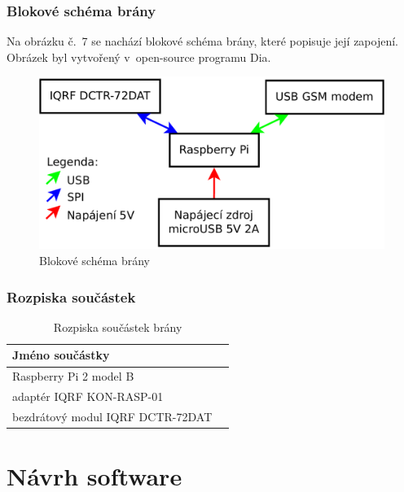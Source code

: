\documentclass[12pt,a4paper,oneside]{article}
\begin{document}
\newpage

\subsubsection{Blokové schéma brány}

Na obrázku č.~7 se nachází blokové schéma brány, které popisuje její zapojení. Obrázek byl vytvořený v~open-source programu Dia\cite{sw/dia}.

\begin{figure}[H]
\centering
\label{fig:blokove-schema-zasuvky}
\includegraphics[width = 128mm]{img/blokove-schema/brana.pdf}
\caption{Blokové schéma brány}
\end{figure}

\subsubsection{Rozpiska součástek}

\begin{table}[H]
	\centering
	\begin{tabular}{|l|l|}
		\hline
    \textbf{Jméno součástky} \\
		\hline
		\hline
    Raspberry Pi 2 model B \\
		\hline
    adaptér IQRF KON-RASP-01 \\
		\hline
    bezdrátový modul IQRF DCTR-72DAT \\
		\hline
	\end{tabular}
	\caption{Rozpiska součástek brány}\label{table:rozpiska-soucastek/brana}
\end{table}

\newpage

\section{Návrh software}
\end{document}
